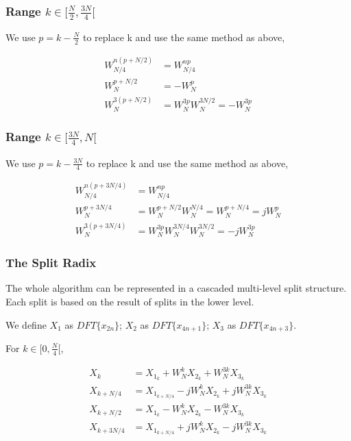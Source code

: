 \documentclass[a4paper]{report}
\begin{document}
\subsubsection{Range $k \in [\frac{N}{2}, \frac{3N}{4}[$} \indent

	We use $p = k - \frac{N}{2}$ to replace k and use the same method as above,
	
	\[\begin{split}
	W_{N/4}^{n(p+N/2)} & = W_{N/4}^{np} \\
	       W_N^{p+N/2} & = -W_N^p \\
	    W_N^{3(p+N/2)} & = W_N^{3p} W_N^{3N/2} = -W_N^{3p}
	\end{split}\]
	
\subsubsection{Range $k \in [\frac{3N}{4}, N[$} \indent

	We use $p = k - \frac{3N}{4}$ to replace k and use the same method as above,
	
	\[\begin{split}
	W_{N/4}^{n(p+3N/4)} & = W_{N/4}^{np} \\
	       W_N^{p+3N/4} & = W_N^{p+N/2} W_N^{N/4} = W_N^{p+N/4} = j W_{N}^p\\
	    W_N^{3(p+3N/4)} & = W_N^{3p} W_N^{3N/4} W_N^{3N/2} = -j W_N^{3p}
	\end{split}\]
	
\subsubsection{The Split Radix} \indent

	The whole algorithm can be represented in a cascaded multi-level split structure. Each split is based on the result of splits in the lower level.
	
	\bigskip
	
	We define $X_1$ as $DFT\{x_{2n}\}$; $X_2$ as $DFT\{x_{4n+1}\}$; $X_3$ as $DFT\{x_{4n+3}\}$.

	\bigskip
	
	For $k \in [0, \frac{N}{4}[$,
	
	\[\begin{split}
  X_k & = X_{1_k} + W_N^k X_{2_k} + W_N^{3k} X_{3_k}\\
  X_{k + N/4} & = X_{1_{k + N/4}} - jW_N^k X_{2_k} + jW_N^{3k} X_{3_k} \\
  X_{k + N/2} & = X_{1_k} - W_N^k X_{2_k} - W_N^{3k} X_{3_k} \\
  X_{k + 3N/4} & = X_{1_{k + N/4}} + jW_N^k X_{2_k} - jW_N^{3k} X_{3_k} \\
	\end{split}\]
\end{document}
